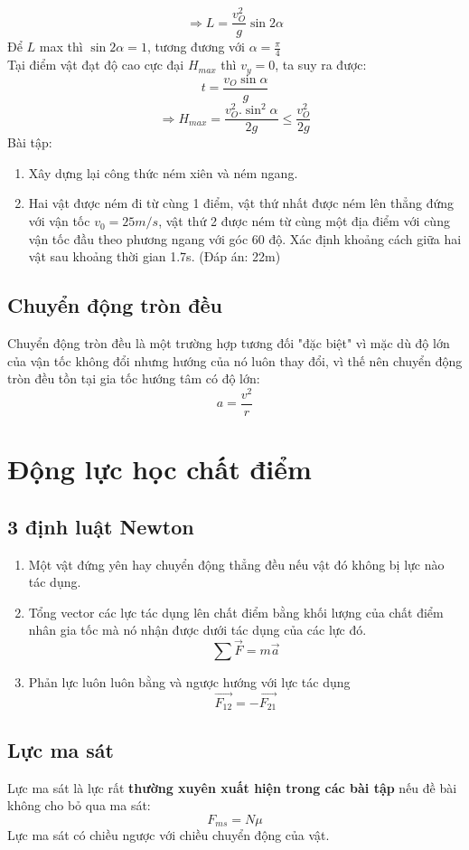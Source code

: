 $$\Rightarrow L=\frac{v_{O}^2}{g}\sin{2\alpha}$$
Để $L$ max thì $\sin{2\alpha}=1$, tương đương với $\alpha=\frac{\pi}{4}$\\
Tại điểm vật đạt độ cao cực đại $H_{max}$ thì $v_{y}=0$, ta suy ra được:
$$t=\frac{v_{O}\sin{\alpha}}{g}$$
\begin{equation}
    \Rightarrow H_{max}=\frac{v_{O}^2.\sin^2{\alpha}}{2g}\leq \frac{v_{O}^2}{2g}
\end{equation}
Bài tập:
\begin{enumerate}
    \item Xây dựng lại công thức ném xiên và ném ngang.
    \item Hai vật được ném đi từ cùng 1 điểm, vật thứ nhất được ném lên thẳng đứng với vận tốc $v_{0}=25m/s$, vật thứ 2 được ném từ cùng một địa điểm với cùng vận tốc đầu theo phương ngang với góc 60 độ. Xác định khoảng cách giữa hai vật sau khoảng thời gian 1.7s. (Đáp án: 22m)
\end{enumerate}
\subsection{Chuyển động tròn đều}
Chuyển động tròn đều là một trường hợp tương đối "đặc biệt" vì mặc dù độ lớn của vận tốc không đổi nhưng hướng của nó luôn thay đổi, vì thế nên chuyển động tròn đều tồn tại gia tốc hướng tâm có độ lớn:
$$a=\frac{v^2}{r}$$
\newpage
\section{Động lực học chất điểm}
\subsection{3 định luật Newton}
\begin{tcolorbox}
    \begin{enumerate}
        \item Một vật đứng yên hay chuyển động thẳng đều nếu vật đó không bị lực nào tác dụng.
        \item Tổng vector các lực tác dụng lên chất điểm bằng khối lượng của chất điểm nhân gia tốc mà nó nhận được dưới tác dụng của các lực đó.
        $$\sum \vec{F}=m\vec{a}$$
        \item Phản lực luôn luôn bằng và ngược hướng với lực tác dụng
        $$\vec{F_{12}}=-\vec{F_{21}}$$ 
    \end{enumerate}
\end{tcolorbox}
\subsection{Lực ma sát}
Lực ma sát là lực rất \textbf{thường xuyên xuất hiện trong các bài tập} nếu đề bài không cho bỏ qua ma sát:
$$F_{ms}=N\mu$$
Lực ma sát có chiều ngược với chiều chuyển động của vật.

